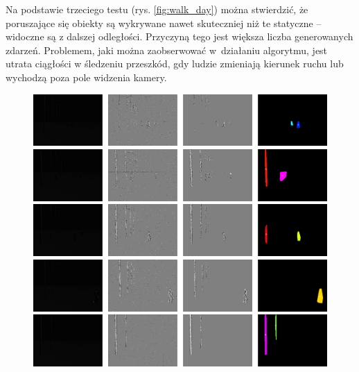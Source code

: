 Na podstawie trzeciego testu (rys. \ref{fig:walk_day}) można stwierdzić, że poruszające się obiekty są wykrywane nawet skuteczniej niż te statyczne -- widoczne są z dalszej odległości.
Przyczyną tego jest większa liczba generowanych zdarzeń. Problemem, jaki można zaobserwować w~działaniu algorytmu, jest utrata ciągłości w śledzeniu przeszkód, gdy ludzie zmieniają kierunek ruchu lub wychodzą poza pole widzenia kamery.

\begin{figure}
    \centering
    \begin{minipage}{1\textwidth}
        \centering
        \includegraphics[width = 1\textwidth]{images/walk_night1.png}
    \end{minipage}
    \begin{minipage}{1\textwidth}
        \centering
        \includegraphics[width = 1\textwidth]{images/walk_night2.png}
    \end{minipage}
    \begin{minipage}{1\textwidth}
        \centering
        \includegraphics[width = 1\textwidth]{images/walk_night5.png}
    \end{minipage}
    \begin{minipage}{1\textwidth}
        \centering
        \includegraphics[width = 1\textwidth]{images/walk_night6.png}
    \end{minipage}
    \begin{minipage}{1\textwidth}
        \centering
        \includegraphics[width = 1\textwidth]{images/walk_night7.png}
    \end{minipage}
   

\end{figure}
